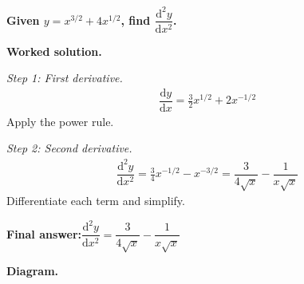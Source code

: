 \documentclass[11pt]{article}
\newcommand{\question}[1]{\par\medskip\noindent\textbf{#1}\par}
\begin{document}
\question{Given \( y = x^{3/2} + 4x^{1/2} \), find \( \dfrac{\mathrm{d}^2y}{\mathrm{d}x^2} \).}

\textbf{Worked solution.}

\textit{Step 1: First derivative.}
\[\begin{gathered}
\dfrac{\mathrm{d}y}{\mathrm{d}x} = \tfrac{3}{2}x^{1/2} + 2x^{-1/2}
\end{gathered}\]
Apply the power rule.

\textit{Step 2: Second derivative.}
\[\begin{gathered}
\dfrac{\mathrm{d}^2y}{\mathrm{d}x^2} = \tfrac{3}{4}x^{-1/2} - x^{-3/2} = \dfrac{3}{4\sqrt{x}} - \dfrac{1}{x\sqrt{x}}
\end{gathered}\]
Differentiate each term and simplify.

\begin{answerbox}
\textbf{Final answer:}\quad \(\displaystyle  \dfrac{\mathrm{d}^2y}{\mathrm{d}x^2} = \dfrac{3}{4\sqrt{x}} - \dfrac{1}{x\sqrt{x}} \)
\end{answerbox}
\textbf{Diagram.}
\end{document}
